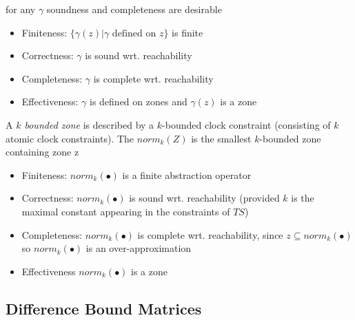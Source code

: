 \documentclass[a4paper, 10pt]{article}
\begin{document}
\begin{mdframed}
for any $\gamma$ soundness and completeness are desirable
\begin{itemize}
    \item Finiteness: $\{\gamma(z)|\gamma \text{ defined on } z\}$ is finite
    \item Correctness: $\gamma$ is sound wrt. reachability
    \item Completeness: $\gamma$ is complete wrt. reachability
    \item Effectiveness: $\gamma$ is defined on zones and $\gamma(z)$ is a zone
\end{itemize}
A \emph{$k$ bounded zone} is described by a $k$-bounded clock constraint (consisting of $k$ atomic clock constraints). The \emph{$norm_k(Z)$} is the smallest $k$-bounded zone containing zone z
\begin{center}
\scalebox{.7}{}
\end{center}
\begin{itemize}
    \item Finiteness: $norm_k(\bullet)$ is a finite abstraction operator
    \item Correctness: $norm_k(\bullet)$ is sound wrt. reachability (provided $k$ is the maximal constant appearing in the constraints of $TS$)
    \item Completeness: $norm_k(\bullet)$ is complete wrt. reachability, since $z\subseteq norm_k(\bullet)$ so $norm_k(\bullet)$ is an over-approximation
    \item Effectiveness $norm_k(\bullet)$ is a zone
\end{itemize}
\end{mdframed}

\subsection{Difference Bound Matrices}
\end{document}
